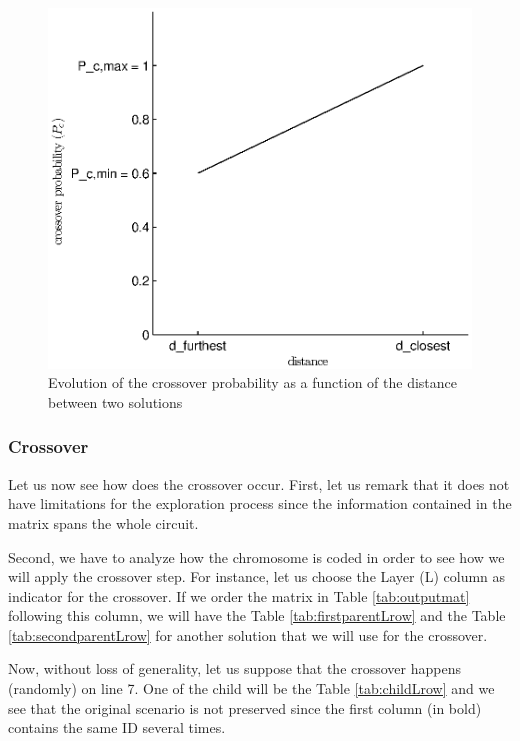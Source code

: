 \begin{figure}[h!]
\begin{center}
\includegraphics[width=\textwidth]{crossover_proba.eps}
\end{center}
\vspace{-0.5cm}
\caption{Evolution of the crossover probability as a function of the distance between two solutions}
\begin{center}
\end{center}
\label{fig:cross_proba}
\end{figure}

\subsubsection{Crossover}

Let us now see how does the crossover occur. First, let us remark that it does not have limitations for the exploration process since the information contained in the matrix spans the whole circuit.

Second, we have to analyze how the chromosome is coded in order to see how we will apply the crossover step. For instance, let us choose the Layer (L) column as indicator for the crossover. If we order the matrix in Table \ref{tab:outputmat} following this column, we will have the Table \ref{tab:firstparentLrow} and the Table \ref{tab:secondparentLrow} for another solution that we will use for the crossover.

Now, without loss of generality, let us suppose that the crossover happens (randomly) on line 7. One of the child will be the Table \ref{tab:childLrow} and we see that the original scenario is not preserved since the first column (in bold) contains the same ID several times.

